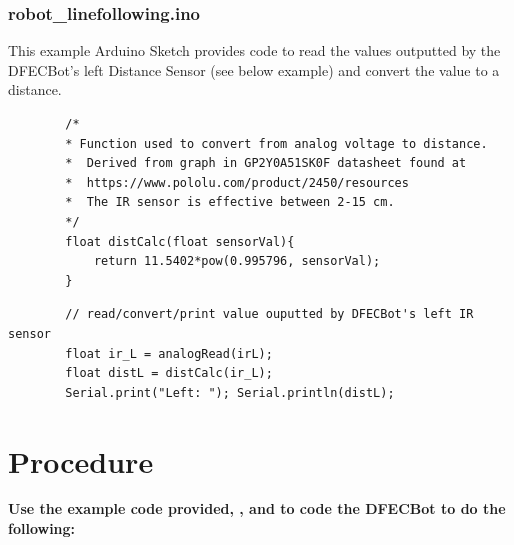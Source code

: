 \documentclass{handout}
\begin{document}
	\subsubsection{robot\_linefollowing.ino}
	This example Arduino Sketch provides code to read the values outputted by the DFECBot's left Distance Sensor (see below example) and convert the value to a distance.
	
	\begin{lstlisting}
		/*
		* Function used to convert from analog voltage to distance. 
		*  Derived from graph in GP2Y0A51SK0F datasheet found at 
		*  https://www.pololu.com/product/2450/resources
		*  The IR sensor is effective between 2-15 cm.
		*/
		float distCalc(float sensorVal){
			return 11.5402*pow(0.995796, sensorVal);
		}
	\end{lstlisting}
	
	\begin{lstlisting}
		// read/convert/print value ouputted by DFECBot's left IR sensor
		float ir_L = analogRead(irL);
		float distL = distCalc(ir_L);
		Serial.print("Left: "); Serial.println(distL);
	\end{lstlisting}
	
	\newpage
	\clearpage
	\pagebreak
	
	\section{Procedure}
	\textbf{Use the example code provided, , and  to code the DFECBot to do the following:}
		
\end{document}
